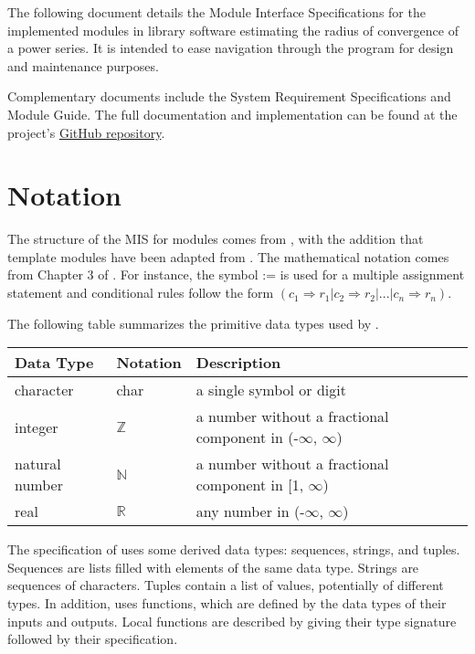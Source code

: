 \documentclass[12pt, titlepage]{article}
\begin{document}
The following document details the Module Interface Specifications for the implemented
modules in library software  estimating the radius of convergence of a power series.
It is intended to ease navigation through the program for design and maintenance purposes.

Complementary documents include the System Requirement Specifications and Module Guide.
The full documentation and implementation can be found at the project's
\href{https://github.com/JohnErnsthausen/roc}{GitHub repository}.

\section{Notation}


The structure of the MIS for modules comes from \citet{HoffmanAndStrooper1995},
with the addition that template modules have been adapted from
\cite{GhezziEtAl2003}.  The mathematical notation comes from Chapter 3 of
\citet{HoffmanAndStrooper1995}.  For instance, the symbol := is used for a
multiple assignment statement and conditional rules follow the form $(c_1
\Rightarrow r_1 | c_2 \Rightarrow r_2 | ... | c_n \Rightarrow r_n )$.

The following table summarizes the primitive data types used by . 

\begin{center}
\renewcommand{\arraystretch}{1.2}
\noindent 
\begin{tabular}{l l p{7.5cm}} 
\toprule 
\textbf{Data Type} & \textbf{Notation} & \textbf{Description}\\ 
\midrule
character & char & a single symbol or digit\\
integer & $\mathbb{Z}$ & a number without a fractional component in (-$\infty$, $\infty$) \\
natural number & $\mathbb{N}$ & a number without a fractional component in [1, $\infty$) \\
real & $\mathbb{R}$ & any number in (-$\infty$, $\infty$)\\
\bottomrule
\end{tabular} 
\end{center}

\noindent
The specification of  uses some derived data types: sequences, strings, and
tuples. Sequences are lists filled with elements of the same data type. Strings
are sequences of characters. Tuples contain a list of values, potentially of
different types. In addition,  uses functions, which
are defined by the data types of their inputs and outputs. Local functions are
described by giving their type signature followed by their specification.
\end{document}
